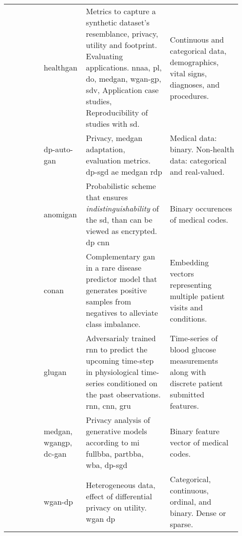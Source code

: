 \begin{landscape}
\begin{longtable}[l]{@{}p{0.15\linewidth}p{0.15\linewidth}p{0.35\linewidth}p{0.3\linewidth}@{}}
        \citeauthor{Yale_2020} & \gls{healthgan}
        & Metrics to capture a synthetic dataset’s resemblance, privacy, utility and footprint. Evaluating applications. \gls{nnaa}, \gls{pl}, \gls{do}, \gls{medgan}, \gls{wgan-gp}, \gls{sdv}, Application case studies, Reproducibility of studies with \gls{sd}.
        & Continuous and categorical data, demographics, vital signs, diagnoses, and procedures.\\
        
        \citeauthor{tanti2019} & \gls{dp-auto-gan}
        & Privacy, \gls{medgan} adaptation, evaluation metrics. \gls{dp-sgd} \gls{ae} \gls{medgan} \gls{rdp}
        & Medical data: binary. Non-health data: categorical and real-valued.\\
        
        \citeauthor{BaeAnomiGAN2020} & \gls{anomigan}
        & Probabilistic scheme that ensures \textit{indistinguishability} of the \gls{sd}, than can be viewed as encrypted. \gls{dp} \gls{cnn}
        & Binary occurences of medical codes.\\
        
        \citeauthor{cui2019conan} & \gls{conan}
        & Complementary \gls{gan} in a rare disease predictor model that generates positive samples from negatives to alleviate class imbalance.
        & Embedding vectors representing multiple patient visits and conditions.\\
        
        \citeauthor{zhu_2020} & \gls{glugan}
        & Adversarialy trained \gls{rnn} to predict the upcoming time-step in physiological time-series conditioned on the past observations. \gls{rnn}, \gls{cnn}, \gls{gru}
        & Time-series of blood glucose measurements along with discrete patient submitted features.\\
        
        \citeauthor{chen2019ganleaks} & \gls{medgan}, \gls{wgangp}, \gls{dc-gan}
        & Privacy analysis of generative models according to \gls{mi} \gls{fullbba}, \gls{partbba}, \gls{wba}, \gls{dp-sgd}
        & Binary feature vector of medical codes.\\
        
        \citeauthor{chincheong2020generation} & \gls{wgan-dp}
        & Heterogeneous data, effect of differential privacy on utility. \gls{wgan} \gls{dp}
        & Categorical, continuous,  ordinal, and binary. Dense or sparse.\\
        

\end{longtable}
\end{landscape}

